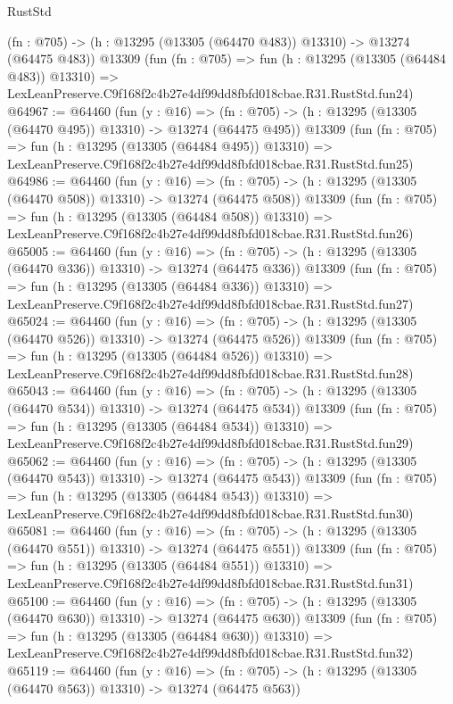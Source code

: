 \begin{lexlean}{RustStd}
\begin{coremodule}
    (fn : @705) -> (h : @13295 (@13305 (@64470 @483)) @13310) -> @13274 (@64475 @483))
    @13309
    (fun (fn : @705) =>
    fun (h : @13295 (@13305 (@64484 @483)) @13310) =>
    LexLeanPreserve.C9f168f2c4b27e4df99dd8fbfd018cbae.R31.RustStd.fun24)
@64967 := @64460
    (fun (y : @16) =>
    (fn : @705) -> (h : @13295 (@13305 (@64470 @495)) @13310) -> @13274 (@64475 @495))
    @13309
    (fun (fn : @705) =>
    fun (h : @13295 (@13305 (@64484 @495)) @13310) =>
    LexLeanPreserve.C9f168f2c4b27e4df99dd8fbfd018cbae.R31.RustStd.fun25)
@64986 := @64460
    (fun (y : @16) =>
    (fn : @705) -> (h : @13295 (@13305 (@64470 @508)) @13310) -> @13274 (@64475 @508))
    @13309
    (fun (fn : @705) =>
    fun (h : @13295 (@13305 (@64484 @508)) @13310) =>
    LexLeanPreserve.C9f168f2c4b27e4df99dd8fbfd018cbae.R31.RustStd.fun26)
@65005 := @64460
    (fun (y : @16) =>
    (fn : @705) -> (h : @13295 (@13305 (@64470 @336)) @13310) -> @13274 (@64475 @336))
    @13309
    (fun (fn : @705) =>
    fun (h : @13295 (@13305 (@64484 @336)) @13310) =>
    LexLeanPreserve.C9f168f2c4b27e4df99dd8fbfd018cbae.R31.RustStd.fun27)
@65024 := @64460
    (fun (y : @16) =>
    (fn : @705) -> (h : @13295 (@13305 (@64470 @526)) @13310) -> @13274 (@64475 @526))
    @13309
    (fun (fn : @705) =>
    fun (h : @13295 (@13305 (@64484 @526)) @13310) =>
    LexLeanPreserve.C9f168f2c4b27e4df99dd8fbfd018cbae.R31.RustStd.fun28)
@65043 := @64460
    (fun (y : @16) =>
    (fn : @705) -> (h : @13295 (@13305 (@64470 @534)) @13310) -> @13274 (@64475 @534))
    @13309
    (fun (fn : @705) =>
    fun (h : @13295 (@13305 (@64484 @534)) @13310) =>
    LexLeanPreserve.C9f168f2c4b27e4df99dd8fbfd018cbae.R31.RustStd.fun29)
@65062 := @64460
    (fun (y : @16) =>
    (fn : @705) -> (h : @13295 (@13305 (@64470 @543)) @13310) -> @13274 (@64475 @543))
    @13309
    (fun (fn : @705) =>
    fun (h : @13295 (@13305 (@64484 @543)) @13310) =>
    LexLeanPreserve.C9f168f2c4b27e4df99dd8fbfd018cbae.R31.RustStd.fun30)
@65081 := @64460
    (fun (y : @16) =>
    (fn : @705) -> (h : @13295 (@13305 (@64470 @551)) @13310) -> @13274 (@64475 @551))
    @13309
    (fun (fn : @705) =>
    fun (h : @13295 (@13305 (@64484 @551)) @13310) =>
    LexLeanPreserve.C9f168f2c4b27e4df99dd8fbfd018cbae.R31.RustStd.fun31)
@65100 := @64460
    (fun (y : @16) =>
    (fn : @705) -> (h : @13295 (@13305 (@64470 @630)) @13310) -> @13274 (@64475 @630))
    @13309
    (fun (fn : @705) =>
    fun (h : @13295 (@13305 (@64484 @630)) @13310) =>
    LexLeanPreserve.C9f168f2c4b27e4df99dd8fbfd018cbae.R31.RustStd.fun32)
@65119 := @64460
    (fun (y : @16) =>
    (fn : @705) -> (h : @13295 (@13305 (@64470 @563)) @13310) -> @13274 (@64475 @563))

\end{coremodule}
\end{lexlean}
